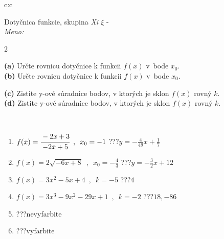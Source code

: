 \documentclass[10pt]{report}
\begin{document}
\begin{tabular}{c:c}
\begin{minipage}[c][104.5mm][t]{0.5\linewidth}
\begin{center}
\vspace{7mm}
{\huge Dotyčnica funkcie, skupina \textit{Xi $\xi$} -}\\[5mm]
\textit{Meno:}\phantom{xxxxxxxxxxxxxxxxxxxxxxxxxxxxxxxxxxxxxxxxxxxxxxxxxxxxxxxxxxxxxxxxx}\\[5mm]
\begin{minipage}{0.95\linewidth}
\begin{center}
{\small \begin{multicols}{2} \raggedright
\textbf{(a)} Určte rovnicu dotyčnice k funkcii \(f(x)\) v~bode \(x_0\). \\[1mm]
\textbf{(b)} Určte rovnicu dotyčnice k funkcii \(f(x)\) v~bode \(x_0\). \par \columnbreak
\textbf{(c)} Zistite y-ové súradnice bodov, v ktorých je sklon \(f(x)\) rovný \(k\). \\[1mm]
\textbf{(d)} Zistite y-ové súradnice bodov, v ktorých je sklon \(f(x)\) rovný \(k\). \\[1mm]
\end{multicols}
}
\end{center}
\end{minipage}
\\[4mm]
\begin{minipage}{0.79\linewidth}
\begin{center}
\begin{varwidth}{\linewidth}
\begin{enumerate}
\normalsizerr
\item $f(x)=\cfrac{-2x+3}{-2x+5}\enspace , \enspace x_0=-1$\quad \dotfill\; ???\;\dotfill \quad $y = -\frac{4}{49}x+\frac{1}{7}$
\item $f(x)=2\sqrt{-6x+8}\enspace , \enspace x_0=-\frac{4}{3}$\quad \dotfill\; ???\;\dotfill \quad $y = -\frac{3}{2}x+12$
\item $f(x)=3x^2-5x+4\enspace , \enspace k=-5$\quad \dotfill\; ???\;\dotfill \quad $4$
\item $f(x)=3x^3-9x^2-29x+1\enspace , \enspace k=-2$\quad \dotfill\; ???\;\dotfill \quad $18 , -86$
\item \quad \dotfill\; ???\;\dotfill \quad nevyfarbite
\item \quad \dotfill\; ???\;\dotfill \quad vyfarbite
\end{enumerate}
\end{varwidth}

\end{center}
\end{minipage}
\end{center}
\end{minipage}
\end{tabular}
\end{document}
